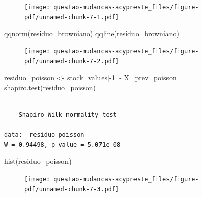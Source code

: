 \documentclass[
  letterpaper,
  DIV=11,
  numbers=noendperiod]{scrreprt}
\newenvironment{Shaded}{\begin{snugshade}}{\end{snugshade}}
\newcommand{\DecValTok}[1]{\textcolor[rgb]{0.68,0.00,0.00}{#1}}
\newcommand{\FunctionTok}[1]{\textcolor[rgb]{0.28,0.35,0.67}{#1}}
\newcommand{\NormalTok}[1]{\textcolor[rgb]{0.00,0.23,0.31}{#1}}
\newcommand{\OtherTok}[1]{\textcolor[rgb]{0.00,0.23,0.31}{#1}}
\newcommand{\SpecialCharTok}[1]{\textcolor[rgb]{0.37,0.37,0.37}{#1}}
\begin{document}
\begin{figure}[H]

{\centering \texttt{[image: questao-mudancas-acypreste\_files/figure-pdf/unnamed-chunk-7-1.pdf]}

}

\end{figure}

\begin{Shaded}
\begin{Highlighting}[]
\FunctionTok{qqnorm}\NormalTok{(residuo\_browniano)}
\FunctionTok{qqline}\NormalTok{(residuo\_browniano)}
\end{Highlighting}
\end{Shaded}

\begin{figure}[H]

{\centering \texttt{[image: questao-mudancas-acypreste\_files/figure-pdf/unnamed-chunk-7-2.pdf]}

}

\end{figure}

\begin{Shaded}
\begin{Highlighting}[]
\NormalTok{residuo\_poisson }\OtherTok{\textless{}{-}}\NormalTok{ stock\_values[}\SpecialCharTok{{-}}\DecValTok{1}\NormalTok{] }\SpecialCharTok{{-}}\NormalTok{ X\_prev\_poisson}
\FunctionTok{shapiro.test}\NormalTok{(residuo\_poisson)}
\end{Highlighting}
\end{Shaded}

\begin{verbatim}

    Shapiro-Wilk normality test

data:  residuo_poisson
W = 0.94498, p-value = 5.071e-08
\end{verbatim}

\begin{Shaded}
\begin{Highlighting}[]
\FunctionTok{hist}\NormalTok{(residuo\_poisson)}
\end{Highlighting}
\end{Shaded}

\begin{figure}[H]

{\centering \texttt{[image: questao-mudancas-acypreste\_files/figure-pdf/unnamed-chunk-7-3.pdf]}

}

\end{figure}
\end{document}
